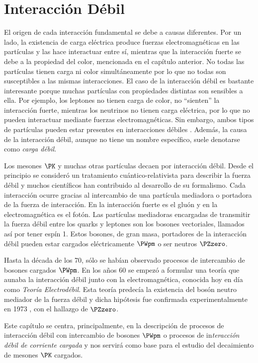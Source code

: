 \chapter{Interacción Débil}\label{cap:weak_int}
El origen de cada interacción fundamental se debe a causas diferentes. Por un lado, la existencia de carga eléctrica produce fuerzas electromagnéticas en las partículas y las hace interactuar entre sí, mientras que la interacción fuerte se debe a la propiedad del color, mencionada en el capítulo anterior. No todas las partículas tienen carga ni color simultáneamente por lo que no todas son susceptibles a las mismas interacciones. El caso de la interacción débil es bastante interesante porque muchas partículas con propiedades distintas son sensibles a ella. Por ejemplo, los leptones no tienen carga de color, no ``sienten'' la interacción fuerte, mientras los neutrinos no tienen carga eléctrica, por lo que no pueden interactuar mediante fuerzas electromagnéticas. Sin embargo, ambos tipos de partículas pueden estar presentes en interacciones débiles \cite{Griffiths2008}. Además, la causa de la interacción débil, aunque no tiene un nombre específico, suele denotarse como \textit{carga débil}.

Los mesones $\PK$ y muchas otras partículas decaen por interacción débil. Desde el principio se consideró un tratamiento cuántico-relativista para describir la fuerza débil y muchos científicos han contribuido al desarrollo de su formalismo. Cada interacción ocurre gracias al intercambio de una partícula mediadora o portadora de la fuerza de interacción. En la interacción fuerte es el gluón y en la electromagnética es el fotón. Las partículas mediadoras encargadas de transmitir la fuerza débil entre los quarks y leptones son los bosones vectoriales, llamados así por tener espín 1. Estos bosones, de gran masa, portadores de la interacción débil pueden estar cargados eléctricamente $\PWpm$ o ser neutros $\PZzero$. 

Hasta la década de los 70, sólo se habían observado procesos de intercambio de bosones cargados $\PWpm$. En los años 60 se empezó a formular una teoría que aunaba la interacción débil junto con la electromagnética, conocida hoy en día como \textit{Teoría Electrodébil}. Esta teoría predecía la existencia del bosón neutro mediador de la fuerza débil y dicha hipótesis fue confirmada experimentalmente en 1973 \cite{BrianM}, con el hallazgo de $\PZzero$.

Este capítulo se centra, principalmente, en la descripción de procesos de interacción débil con intercambio de bosones $\PWpm$ o procesos de in\textit{teracción débil de corriente cargada} y nos servirá como base para el estudio del decaimiento de mesones $\PK$ cargados.

